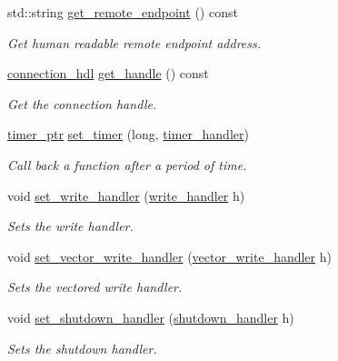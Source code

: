 \begin{DoxyCompactItemize}
std\+::string \hyperlink{classwebsocketpp_1_1transport_1_1iostream_1_1connection_ac820670c56c28bc6ce73214889cd23d6}{get\+\_\+remote\+\_\+endpoint} () const 
\begin{DoxyCompactList}\small\item\em Get human readable remote endpoint address. \end{DoxyCompactList}\item 
\hyperlink{namespacewebsocketpp_a6b3d26a10ee7229b84b776786332631d}{connection\+\_\+hdl} \hyperlink{classwebsocketpp_1_1transport_1_1iostream_1_1connection_a05a1f4590ee8dbcced991367ba22e21f}{get\+\_\+handle} () const 
\begin{DoxyCompactList}\small\item\em Get the connection handle. \end{DoxyCompactList}\item 
\hyperlink{classwebsocketpp_1_1transport_1_1iostream_1_1connection_a03c72162b1eaa9faa528bc16d9e0c2d0}{timer\+\_\+ptr} \hyperlink{classwebsocketpp_1_1transport_1_1iostream_1_1connection_a7852f9c0dc64d6e51b57b4a28302a602}{set\+\_\+timer} (long, \hyperlink{namespacewebsocketpp_1_1transport_a946cc56ff41139f3002149c15fd87bc9}{timer\+\_\+handler})
\begin{DoxyCompactList}\small\item\em Call back a function after a period of time. \end{DoxyCompactList}\item 
void \hyperlink{classwebsocketpp_1_1transport_1_1iostream_1_1connection_a32740c33406e5484da7f030fb106ae22}{set\+\_\+write\+\_\+handler} (\hyperlink{namespacewebsocketpp_1_1transport_1_1iostream_abc22b834c2d0c698d6c87e51d5bfad2c}{write\+\_\+handler} h)
\begin{DoxyCompactList}\small\item\em Sets the write handler. \end{DoxyCompactList}\item 
void \hyperlink{classwebsocketpp_1_1transport_1_1iostream_1_1connection_aa035dc6275c5babb99c0cbada8521b5c}{set\+\_\+vector\+\_\+write\+\_\+handler} (\hyperlink{namespacewebsocketpp_1_1transport_1_1iostream_a21982146513c0b5580786c3af5dd2878}{vector\+\_\+write\+\_\+handler} h)
\begin{DoxyCompactList}\small\item\em Sets the vectored write handler. \end{DoxyCompactList}\item 
void \hyperlink{classwebsocketpp_1_1transport_1_1iostream_1_1connection_a37bb9ef90b3d183c238a32cf9f056d4b}{set\+\_\+shutdown\+\_\+handler} (\hyperlink{namespacewebsocketpp_1_1transport_1_1iostream_a3563ce2cca06b1466f7d76ecb8eb4a0b}{shutdown\+\_\+handler} h)
\begin{DoxyCompactList}\small\item\em Sets the shutdown handler. \end{DoxyCompactList}\end{DoxyCompactItemize}
